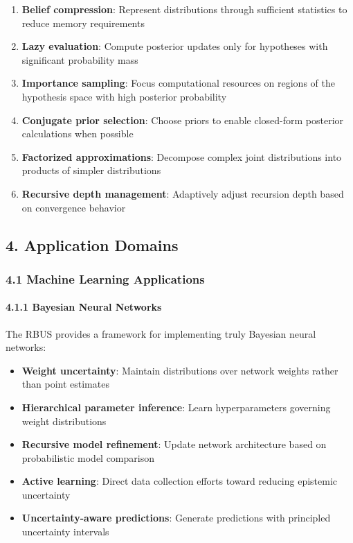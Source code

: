 \documentclass[
]{article}
\providecommand{\tightlist}{%
  \setlength{\itemsep}{0pt}\setlength{\parskip}{0pt}}
\begin{document}
\begin{enumerate}
\def\labelenumi{\arabic{enumi}.}
\tightlist
\item
  \textbf{Belief compression}: Represent distributions through
  sufficient statistics to reduce memory requirements
\item
  \textbf{Lazy evaluation}: Compute posterior updates only for
  hypotheses with significant probability mass
\item
  \textbf{Importance sampling}: Focus computational resources on regions
  of the hypothesis space with high posterior probability
\item
  \textbf{Conjugate prior selection}: Choose priors to enable
  closed-form posterior calculations when possible
\item
  \textbf{Factorized approximations}: Decompose complex joint
  distributions into products of simpler distributions
\item
  \textbf{Recursive depth management}: Adaptively adjust recursion depth
  based on convergence behavior
\end{enumerate}

\subsection{4. Application Domains}\label{application-domains-1}

\subsubsection{4.1 Machine Learning
Applications}\label{machine-learning-applications-1}

\paragraph{4.1.1 Bayesian Neural
Networks}\label{bayesian-neural-networks}

The RBUS provides a framework for implementing truly Bayesian neural
networks:

\begin{itemize}
\tightlist
\item
  \textbf{Weight uncertainty}: Maintain distributions over network
  weights rather than point estimates
\item
  \textbf{Hierarchical parameter inference}: Learn hyperparameters
  governing weight distributions
\item
  \textbf{Recursive model refinement}: Update network architecture based
  on probabilistic model comparison
\item
  \textbf{Active learning}: Direct data collection efforts toward
  reducing epistemic uncertainty
\item
  \textbf{Uncertainty-aware predictions}: Generate predictions with
  principled uncertainty intervals
\end{itemize}
\end{document}
